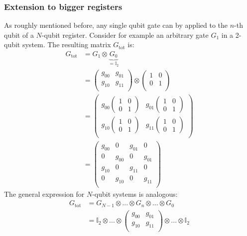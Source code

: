 \documentclass[bibliography=totocnumbered]{article}
\theoremstyle{NoticeStyle}
\begin{document}
\subsubsection{Extension to bigger registers}
As roughly mentioned before, any single qubit gate can by applied to the $n$-th qubit of a $N$-qubit register. Consider for example an arbitrary gate $G_1$ in a 2-qubit system. The resulting matrix $G_\text{tot}$ is:
%
\begin{align}
	G_\text{tot} 
	&= G_1 \otimes \underbrace{G_0}_{=\mathbb{I}_2}\\
	&=
	\begin{pmatrix}
		g_{00} & g_{01}\\
		g_{10} & g_{11}\\
	\end{pmatrix}
	\otimes
	\begin{pmatrix}
		1 & 0\\
		0 & 1\\
	\end{pmatrix}\\
	&=
	\begin{pmatrix}
		g_{00} \left(\begin{smallmatrix}1& 0\\ 0& 1\end{smallmatrix}\right) & g_{01} \left(\begin{smallmatrix}1& 0\\ 0& 1\end{smallmatrix}\right)\\
		g_{10} \left(\begin{smallmatrix}1& 0\\ 0& 1\end{smallmatrix}\right) & g_{11} \left(\begin{smallmatrix}1& 0\\ 0& 1\end{smallmatrix}\right)\\
	\end{pmatrix}
	\\
	&=
	\begin{pmatrix}
		g_{00} & 0 & g_{01} & 0\\
		0 & g_{00} & 0 & g_{01}\\
		g_{10} & 0 & g_{11} & 0\\
		0 & g_{10} & 0 & g_{11}\\
	\end{pmatrix}
\end{align}
%
%
The general expression for $N$-qubit systems is analogous:
%
\begin{align}
	G_\text{tot} 
	&= G_{N-1} \otimes ... \otimes G_n \otimes ...\otimes G_0\\
	&= \mathbb{I}_2 \otimes ... \otimes
	\left(
	\begin{smallmatrix}
		g_{00} & g_{01}\\
		g_{10} & g_{11}\\
	\end{smallmatrix}
	\right)
	\otimes ...\otimes \mathbb{I}_2
\end{align}
%
\end{document}
